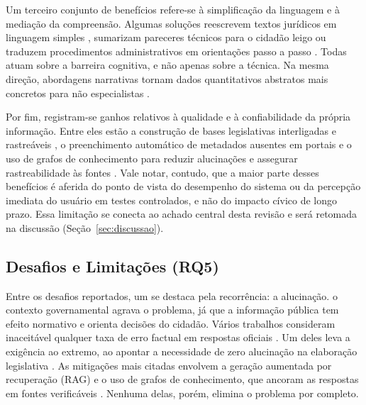 Um terceiro conjunto de benefícios refere-se à simplificação da linguagem e à mediação da compreensão. Algumas soluções reescrevem textos jurídicos em linguagem simples \citep{Freitas_Silva_2026}, sumarizam pareceres técnicos para o cidadão leigo \citep{wcge} ou traduzem procedimentos administrativos em orientações passo a passo \citep{HeyGoogleTaxes2025}. Todas atuam sobre a barreira cognitiva, e não apenas sobre a técnica. Na mesma direção, abordagens narrativas tornam dados quantitativos abstratos mais concretos para não especialistas \citep{RobotStorytelling2025}.

Por fim, registram-se ganhos relativos à qualidade e à confiabilidade da própria informação. Entre eles estão a construção de bases legislativas interligadas e rastreáveis \citep{Colombo2025}, o preenchimento automático de metadados ausentes em portais \citep{TAGIFY2025} e o uso de grafos de conhecimento para reduzir alucinações e assegurar rastreabilidade às fontes \citep{HybridGraphRAG2025}. Vale notar, contudo, que a maior parte desses benefícios é aferida do ponto de vista do desempenho do sistema ou da percepção imediata do usuário em testes controlados, e não do impacto cívico de longo prazo. Essa limitação se conecta ao achado central desta revisão e será retomada na discussão (Seção~\ref{sec:discussao}).

\subsection{Desafios e Limitações (RQ5)}
\label{subsec:rq5}

Entre os desafios reportados, um se destaca pela recorrência: a alucinação.  o contexto governamental agrava o problema, já que a informação pública tem efeito normativo e orienta decisões do cidadão. Vários trabalhos consideram inaceitável qualquer taxa de erro factual em respostas oficiais \citep{Gao2023}. Um deles leva a exigência ao extremo, ao apontar a necessidade de zero alucinação na elaboração legislativa \citep{Colombo2024}. As mitigações mais citadas envolvem a geração aumentada por recuperação (RAG) e o uso de grafos de conhecimento, que ancoram as respostas em fontes verificáveis \citep{HybridGraphRAG2025,Nagesh2025,Tsourma2025,Giarelis2026,Ryu2025}. Nenhuma delas, porém, elimina o problema por completo.

